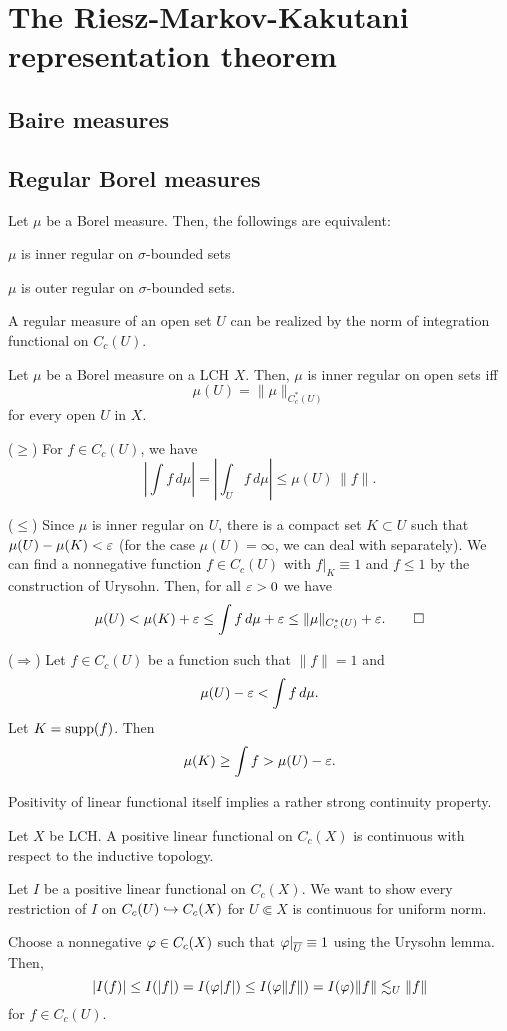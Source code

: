 \documentclass{../note}
\begin{document}
\chapter{The Riesz-Markov-Kakutani representation theorem}
\section{Baire measures}

\section{Regular Borel measures}

\begin{thm}
Let $\mu$ be a Borel measure.
Then, the followings are equivalent:
\begin{parts}
\item$\mu$ is inner regular on $\sigma$-bounded sets
\item $\mu$ is outer regular on $\sigma$-bounded sets.
\end{parts}
\end{thm}


A regular measure of an open set $U$ can be realized by the norm of integration functional on $C_c(U)$.
\begin{lem}
Let $\mu$ be a Borel measure on a LCH $X$.
Then, $\mu$ is inner regular on open sets iff
\[\mu(U)=\|\mu\|_{C_c^*(U)}\]
for every open $U$ in $X$.
\end{lem}
\begin{pf}
($\ge$)
For $f\in C_c(U)$, we have
\[|\int f\,d\mu|=|\int_Uf\,d\mu|\le\mu(U)\,\|f\|.\]

($\le$)
Since $\mu$ is inner regular on $U$, there is a compact set $K\subset U$ such that $\mu(U)-\mu(K)<\varepsilon$ (for the case $\mu(U)=\infty$, we can deal with separately).
We can find a nonnegative function $f\in C_c(U)$ with $f|_K \equiv 1$ and $f\le1$ by the construction of Urysohn.
Then, for all $\varepsilon>0$ we have
\[\mu(U)<\mu(K)+\varepsilon\le\int f\,d\mu+\varepsilon\le\|\mu\|_{C_c^*(U)}+\varepsilon.\qedhere\]

($\Rightarrow$)
Let $f\in C_c(U)$ be a function such that $\|f\|=1$ and
\[\mu(U)-\varepsilon<\int f\,d\mu.\]
Let $K=\operatorname{supp}(f)$.
Then
\[\mu(K)\ge\int f>\mu(U)-\varepsilon.\]
\end{pf}


Positivity of linear functional itself implies a rather strong continuity property.
\begin{thm}
Let $X$ be LCH.
A positive linear functional on $C_c(X)$ is continuous with respect to the inductive topology.
\end{thm}
\begin{pf}
Let $I$ be a positive linear functional on $C_c(X)$.
We want to show every restriction of $I$ on $C_c(U)\hookrightarrow C_c(X)$ for $U\Subset X$ is continuous for uniform norm.

Choose a nonnegative $\varphi\in C_c(X)$ such that $\varphi|_{\overline{U}}\equiv1$ using the Urysohn lemma.
Then,
\[|I(f)|\le I(|f|)=I(\varphi|f|)\le I(\varphi\|f\|)=I(\varphi)\|f\|\lesssim_U\|f\|\]
for $f\in C_c(U)$.
\end{pf}
\end{document}
